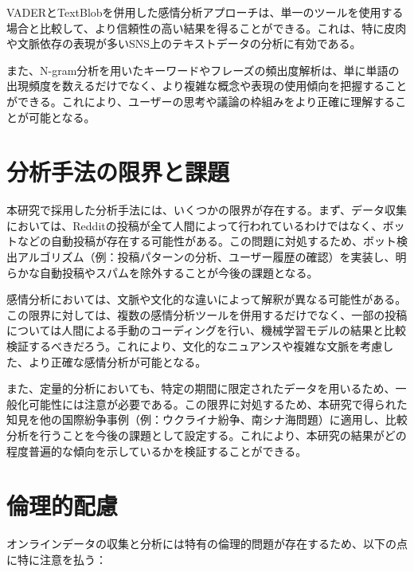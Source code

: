 \documentclass[11pt, a4j]{jreport}
\begin{document}
    VADERとTextBlobを併用した感情分析アプローチは、単一のツールを使用する場合と比較して、より信頼性の高い結果を得ることができる。これは、特に皮肉や文脈依存の表現が多いSNS上のテキストデータの分析に有効である。

    また、N-gram分析を用いたキーワードやフレーズの頻出度解析は、単に単語の出現頻度を数えるだけでなく、より複雑な概念や表現の使用傾向を把握することができる。これにより、ユーザーの思考や議論の枠組みをより正確に理解することが可能となる。

    \section{分析手法の限界と課題}
    本研究で採用した分析手法には、いくつかの限界が存在する。まず、データ収集においては、Redditの投稿が全て人間によって行われているわけではなく、ボットなどの自動投稿が存在する可能性がある。この問題に対処するため、ボット検出アルゴリズム（例：投稿パターンの分析、ユーザー履歴の確認）を実装し、明らかな自動投稿やスパムを除外することが今後の課題となる。

    感情分析においては、文脈や文化的な違いによって解釈が異なる可能性がある。この限界に対しては、複数の感情分析ツールを併用するだけでなく、一部の投稿については人間による手動のコーディングを行い、機械学習モデルの結果と比較検証するべきだろう。これにより、文化的なニュアンスや複雑な文脈を考慮した、より正確な感情分析が可能となる。

    また、定量的分析においても、特定の期間に限定されたデータを用いるため、一般化可能性には注意が必要である。この限界に対処するため、本研究で得られた知見を他の国際紛争事例（例：ウクライナ紛争、南シナ海問題）に適用し、比較分析を行うことを今後の課題として設定する。これにより、本研究の結果がどの程度普遍的な傾向を示しているかを検証することができる。

    \section{倫理的配慮}
    オンラインデータの収集と分析には特有の倫理的問題が存在するため、以下の点に特に注意を払う：
\end{document}

